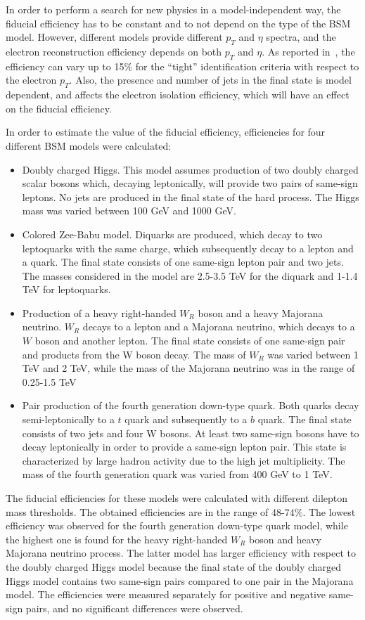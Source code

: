 In order to perform a search for new physics in a model-independent way, the fiducial efficiency has to be constant and to not depend on the type of the BSM model.
However, different models provide different $p_T$ and $\eta$ spectra, and the electron reconstruction efficiency depends on both $p_T$ and $\eta$.
As reported in~\cite{electron_tight}, the efficiency can vary up to 15$\%$ for the ``tight'' identification criteria with respect to the electron $p_T$.
Also, the presence and number of jets in the final state is model dependent, and affects the electron isolation efficiency, which will have an effect on 
the fiducial efficiency.

In order to estimate the value of the fiducial efficiency, efficiencies for four different BSM models were calculated:
\begin{itemize}
 \item Doubly charged Higgs. This model assumes production of two doubly charged scalar bosons which, decaying leptonically, will provide two pairs of same-sign leptons.
 No jets are produced in the final state of the hard process. The Higgs mass was varied between 100 GeV and 1000 GeV.
 \item Colored Zee-Babu model. Diquarks are produced, which decay to two leptoquarks with the same charge, 
 which subsequently decay to a lepton and a quark. The final state consists of one same-sign lepton pair and two jets.
 The masses considered in the model are 2.5-3.5 TeV for the diquark and 1-1.4 TeV for leptoquarks.
 \item Production of a heavy right-handed $W_R$ boson and a heavy Majorana neutrino. $W_R$ decays to a lepton and a Majorana neutrino, 
 which decays to a $W$ boson and another lepton. The final state consists of one same-sign pair and products from the W boson decay.
 The mass of $W_R$ was varied between 1 TeV and 2 TeV, while the mass of the Majorana neutrino was in the range of 0.25-1.5 TeV
 \item Pair production of the fourth generation down-type quark. Both quarks decay semi-leptonically to a $t$ quark and subsequently to a $b$ quark.
 The final state consists of two jets and four W bosons. At least two same-sign bosons have to decay leptonically in order to provide a same-sign lepton pair.
 This state is characterized by large hadron activity due to the high jet multiplicity.
 The mass of the fourth generation quark was varied from 400 GeV to 1 TeV.
\end{itemize}
The fiducial efficiencies for these models were calculated with different dilepton mass thresholds.
The obtained efficiencies are in the range of 48-74$\%$. The lowest efficiency was observed for the fourth generation down-type quark model, while the highest one is found for the heavy right-handed $W_R$ boson and heavy Majorana neutrino process. The latter model has larger efficiency with respect to the doubly charged Higgs model
because the final state of the doubly charged Higgs model contains two same-sign pairs compared to one pair in the Majorana model.
The efficiencies were measured separately for positive and negative same-sign pairs, and no significant differences were observed.

